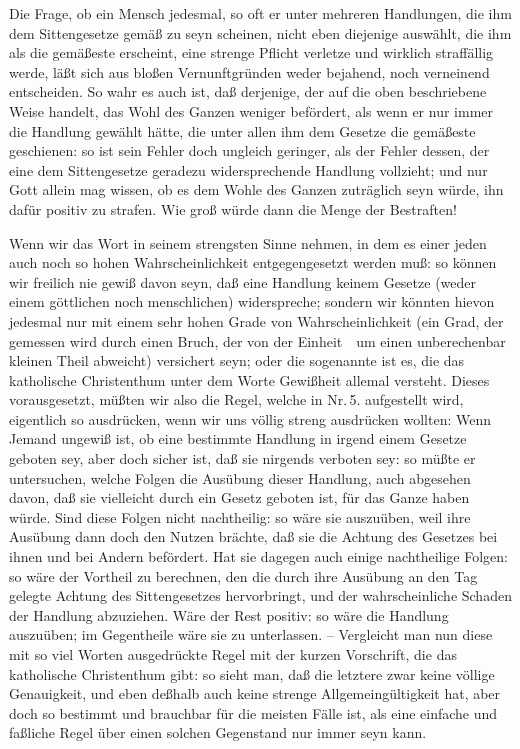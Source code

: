 \begin{aufza}
\item Die Frage, ob ein Mensch jedesmal, so oft er unter mehreren Handlungen, die ihm dem Sittengesetze gemäß zu seyn scheinen, nicht eben diejenige auswählt, die ihm als die gemäßeste erscheint, eine strenge Pflicht verletze und wirklich straffällig werde, läßt sich aus bloßen Vernunftgründen weder bejahend, noch verneinend entscheiden. So wahr es auch ist, daß derjenige, der auf die oben beschriebene Weise handelt, das Wohl des Ganzen weniger befördert, als wenn er nur immer die Handlung gewählt hätte, die unter allen ihm dem Gesetze die gemäßeste geschienen: so ist sein Fehler doch ungleich geringer, als der Fehler dessen, der eine dem Sittengesetze geradezu widersprechende Handlung vollzieht; und nur Gott allein mag wissen, ob es dem Wohle des Ganzen zuträglich seyn würde, ihn dafür positiv zu strafen. Wie groß würde dann die Menge der Bestraften!
\item Wenn wir das Wort  in seinem strengsten Sinne nehmen, in dem es einer jeden auch noch so hohen Wahrscheinlichkeit entgegengesetzt werden muß: so können wir freilich nie gewiß davon seyn, daß eine Handlung keinem Gesetze (weder einem göttlichen noch menschlichen) widerspreche; sondern wir könnten hievon jedesmal nur mit einem sehr hohen Grade von Wahrscheinlichkeit (ein Grad, der gemessen wird durch einen Bruch, der von der Einheit~\ um einen unberechenbar kleinen Theil abweicht) versichert seyn; oder die sogenannte  ist es, die das katholische Christenthum unter dem Worte Gewißheit allemal versteht. Dieses vorausgesetzt, müßten wir also die Regel, welche in Nr.\,5. aufgestellt wird, eigentlich so ausdrücken, wenn wir uns völlig streng ausdrücken wollten: Wenn Jemand ungewiß ist, ob eine bestimmte Handlung in irgend einem Gesetze geboten sey, aber doch sicher ist, daß sie nirgends verboten sey: so müßte er untersuchen, welche Folgen die Ausübung dieser Handlung, auch abgesehen davon, daß sie vielleicht durch ein Gesetz geboten ist, für das Ganze haben würde. Sind diese Folgen nicht nachtheilig: so wäre sie auszuüben, weil ihre Ausübung dann doch den Nutzen brächte, daß sie die Achtung des Gesetzes bei ihnen und bei Andern befördert. Hat sie dagegen auch einige nachtheilige Folgen: so wäre der Vortheil zu berechnen, den die durch ihre Ausübung an den Tag gelegte Achtung des Sittengesetzes hervorbringt, und der wahrscheinliche Schaden der Handlung abzuziehen. Wäre der Rest positiv: so wäre die Handlung auszuüben; im Gegentheile wäre sie zu unterlassen. -- Vergleicht man nun diese mit so viel Worten ausgedrückte Regel mit der kurzen Vorschrift, die das katholische Christenthum gibt: so sieht man, daß die letztere zwar keine völlige Genauigkeit, und eben deßhalb auch keine strenge Allgemeingültigkeit hat, aber doch so bestimmt und brauchbar für die meisten Fälle ist, als eine einfache und faßliche Regel über einen solchen Gegenstand nur immer seyn kann.

\end{aufza}
